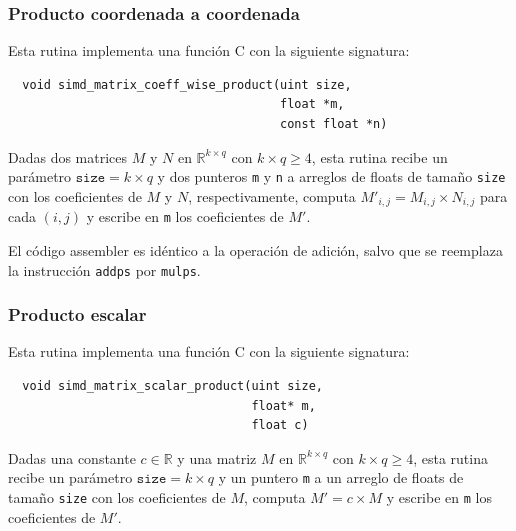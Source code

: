 \documentclass[a4paper, 10pt, twoside]{article}
\newcommand{\cc}[1]{\texttt{#1}}
\begin{document}
\subsubsection{Producto coordenada a coordenada}

Esta rutina implementa una función C con la siguiente signatura:

\begin{verbatim}
  void simd_matrix_coeff_wise_product(uint size,
                                      float *m,
                                      const float *n)
\end{verbatim}

Dadas dos matrices $M$ y $N$ en $\mathbb{R}^{k \times q}$ con $k \times q \geq
4$, esta rutina recibe un parámetro $\cc{size} = k \times q$ y dos punteros
\cc{m} y \cc{n} a arreglos de floats de tamaño \cc{size} con los coeficientes
de $M$ y $N$, respectivamente, computa $M'_{i,j} = M_{i,j} \times N_{i,j}$ para
cada $(i,j)$ y escribe en \cc{m} los coeficientes de $M'$.

El código assembler es idéntico a la operación de adición, salvo que se
reemplaza la instrucción \cc{addps} por \cc{mulps}.


\subsubsection{Producto escalar}

Esta rutina implementa una función C con la siguiente signatura:

\begin{verbatim}
  void simd_matrix_scalar_product(uint size,
                                  float* m,
                                  float c)
\end{verbatim}

Dadas una constante $c \in \mathbb{R}$ y una matriz $M$ en $\mathbb{R}^{k
\times q}$ con $k \times q \geq 4$, esta rutina recibe un parámetro $\cc{size}
= k \times q$ y un puntero \cc{m} a un arreglo de floats de tamaño \cc{size}
con los coeficientes de $M$, computa $M' = c \times M$ y escribe en \cc{m} los
coeficientes de $M'$.
\end{document}
